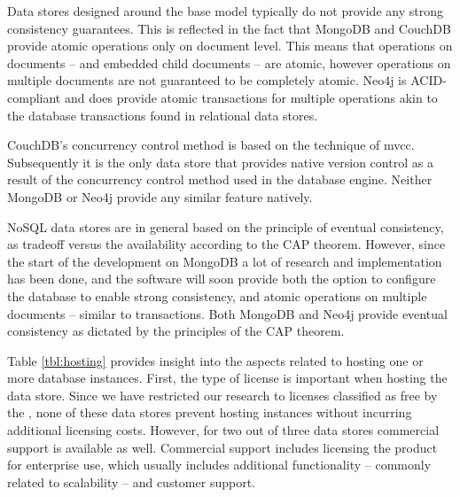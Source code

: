 Data stores designed around the \gls{base} model typically do not provide any strong consistency guarantees.
This is reflected in the fact that MongoDB and CouchDB provide atomic operations only on document level.
This means that operations on documents -- and embedded child documents -- are atomic, however operations on multiple documents are not guaranteed to be completely atomic.
Neo4j is ACID-compliant and does provide atomic transactions for multiple operations akin to the database transactions found in relational data stores.

CouchDB's concurrency control method is based on the technique of \gls{mvcc}.
Subsequently it is the only data store that provides native version control as a result of the concurrency control method used in the database engine.
Neither MongoDB or Neo4j provide any similar feature natively.

NoSQL data stores are in general based on the principle of eventual consistency, as tradeoff versus the availability according to the CAP theorem.
However, since the start of the development on MongoDB a lot of research and implementation has been done, and the software will soon provide both the option to configure the database to enable strong consistency, and atomic operations on multiple documents -- similar to transactions.
Both MongoDB and Neo4j provide eventual consistency as dictated by the principles of the CAP theorem.

\begin{landscape}
  
\end{landscape}


\begin{landscape}
  
\end{landscape}

Table \ref{tbl:hosting} provides insight into the aspects related to hosting one or more database instances.
First, the type of license is important when hosting the data store.
Since we have restricted our research to licenses classified as free by the \textcite{FreeSoftwareFoundation1985}, none of these data stores prevent hosting instances without incurring additional licensing costs.
However, for two out of three data stores commercial support is available as well.
Commercial support includes licensing the product for enterprise use, which usually includes additional functionality -- commonly related to scalability -- and customer support.

